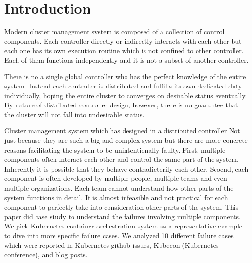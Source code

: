 \section{Introduction}
\label{sec:introduction}

Modern cluster management system is composed of a collection of control components. Each controller directly or indirectly interacts with each other but each one has its own execution routine which is not confined to other controller. Each of them functions independently and it is not a subset of another controller.

There is no a single global controller who has the perfect knowledge of the entire system. Instead each controller is distributed and fulfills its own dedicated duty individually, hoping the entire cluster to converges on desirable status eventually. By nature of distributed controller design, however, there is no guarantee that the cluster will not fall into undesirable status. 

Cluster management system which has designed in a distributed controller Not just because they are such a big and complex system but there are more concrete reasons facilitating the system to be unintentionally faulty. First, multiple components often interact each other and control the same part of the system. Inherently it is possible that they behave contradictorily each other. Seocnd, each component is often developed by multiple people, multiple teams and even multiple organizations. Each team cannot understand how other parts of the system functions in detail. It is almost infeasible and not practical for each component to perfectly take into consideration other parts of the system. This paper did case study to understand the failures involving multiple components. We pick Kubernetes container orchestration system as a representative example to dive into more specific failure cases. We analyzed 10 different failure cases which were reported in Kubernetes github issues, Kubecon (Kubernetes conference), and blog posts.
